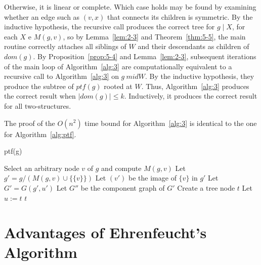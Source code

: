 Otherwise, it is linear or complete.
Which case holds may be found by examining whether an edge such as $(v, x)$ that connects its children is symmetric.
By the inductive hypothesis, the recursive call produces the correct tree for $g \mid X$, for each $X$ e $M(g,v)$, so by Lemma~\ref{lem:2-3} and Theorem~\ref{thm:5-5}, the main routine correctly attaches all siblings of $W$ and their descendants as children of $dom(g)$.
By Proposition~\ref{prop:5-4} and Lemma~\ref{lem:2-3}, subsequent iterations of the main loop of Algorithm~\ref{alg:3} are computationally equivalent to a recursive call to Algorithm~\ref{alg:3} on $g \ mid W$.
By the inductive hypothesis, they produce the subtree of $ptf(g)$ rooted at $W$.
Thus, Algorithm~\ref{alg:3} produces the correct result when $\mid dom(g) \mid \leq k$.
Inductively, it produces the correct result for all two-structures.

The proof of the $O(n^2)$ time bound for Algorithm~\ref{alg:3} is identical to the one for Algorithm~\ref{alg:ptf}.

\begin{algorithm}[H]
    \caption{ptf(g)}
    \label{alg:3}
    Select an arbitrary node $v$ of $g$ and compute $M(g, v)$\;
    Let $g' = g / (M(g, v) \cup \{\{v\}\})$\;
    Let $(v')$ be the image of $\{v\}$ in $g'$\;
    Let $G' = G(g', u')$\;
    Let $G''$ be the component graph of $G'$\;
    Create a tree node $t$\;
    Let $u := t$\;
    \Return $t$\;
\end{algorithm}


\section{Advantages of Ehrenfeucht's Algorithm}\label{sec:advantages-of-ehrenfeucht's-algorithm}

